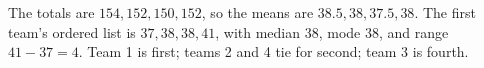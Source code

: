 The totals are $154,152,150,152$, so the means are $38.5,38,37.5,38$. The first team's ordered list is $37,38,38,41$, with median $38$, mode $38$, and range $41-37=4$. Team 1 is first; teams 2 and 4 tie for second; team 3 is fourth.
